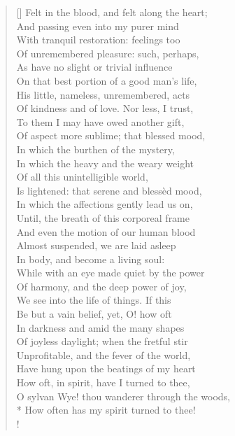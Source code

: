 \documentclass[MAIN]{subfiles}
\begin{document}
\begin{verse}[\versewidth]
Felt in the blood, and felt along the heart;\\ 
And passing even into my purer mind\\
With tranquil restoration: feelings too\\ 
Of unremembered pleasure: such, perhaps,\\ 
As have no slight or trivial influence\\
On that best portion of a good man's life,\\ 
His little, nameless, unremembered, acts\\
Of kindness and of love. Nor less, I trust,\\ 
To them I may have owed another gift,\\
Of aspect more sublime; that blessed mood,\\ 
In which the burthen of the mystery,\\
In which the heavy and the weary weight\\ 
Of all this unintelligible world,\\
Is lightened: that serene and bless\`ed mood,\\ 
In which the affections gently lead us on,\\
Until, the breath of this corporeal frame\\
And even the motion of our human blood\\
Almost suspended, we are laid asleep\\
In body, and become a living soul:\\
While with an eye made quiet by the power\\ 
Of harmony, and the deep power of joy,\\
We see into the life of things. If this\\ 
Be but a vain belief, yet, O! how oft\\
In darkness and amid the many shapes\\
Of joyless daylight; when the fretful stir\\ 
Unprofitable, and the fever of the world,\\
Have hung upon the beatings of my heart\\
How oft, in spirit, have I turned to thee,\\ 
O sylvan {\sc Wye}! thou wanderer through the woods,\\* 
How often has my spirit turned to thee!\\!


\end{verse}
\end{document}
